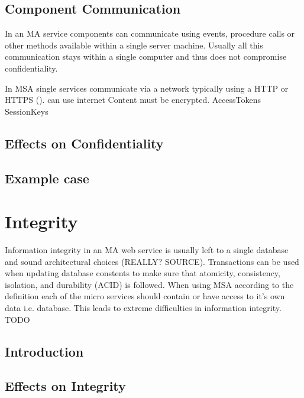 \subsection{Component Communication}
\begin{sloppypar}
    In an MA service components can communicate using events, 
    procedure calls or other methods available within a single server machine. 
    Usually all this communication stays within a single computer and thus does not compromise confidentiality.

    In MSA single services communicate via a network typically using a HTTP or HTTPS (). 
    can use internet
    Content must be encrypted.
    AccessTokens
    SessionKeys




\end{sloppypar}

\subsection{Effects on Confidentiality}


\subsection{Example case}

\section{Integrity}
\begin{sloppypar}
    Information integrity in an MA web service is usually left to a single database 
    and sound architectural choices (REALLY? SOURCE).
    Transactions can be used when updating database constents to make sure that
    atomicity, consistency, isolation, and durability (ACID) \citep{acid} is followed.
    When using MSA according to the definition each of the micro services should contain 
    or have access to it's own data i.e. database. This leads to extreme difficulties in information integrity.
    TODO
\end{sloppypar}


\subsection{Introduction}
\subsection{Effects on Integrity}
